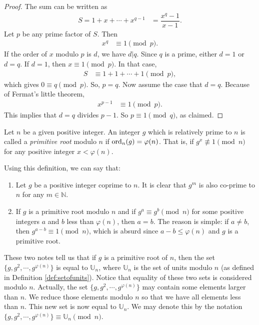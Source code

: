 \documentclass{subfile}
\begin{document}
	\begin{proof}
		The sum can be written as
			\begin{align*}
				S = 1+x+\cdots+x^{q-1} & = \dfrac{x^q-1}{x-1}.
			\end{align*}
		Let $p$ be any prime factor of $S$. Then
			\begin{align*}
				x^q & \equiv1\pmod p.
			\end{align*}
		If the order of $x$ modulo $p$ is $d$, we have $d|q$. Since $q$ is a prime, either $d=1$ or $d=q$. If $d=1$, then $x\equiv1\pmod p$. In that case,
			\begin{align*}
				S & \equiv 1+1+\cdots+1\pmod p,
			\end{align*}
		which gives $0  \equiv q\pmod p$. So, $p=q$. Now assume the case that $d=q$. Because of Fermat's little theorem,
			\begin{align*}
				x^{p-1} & \equiv1\pmod p.
			\end{align*}
		This implies that $d=q$ divides $p-1$. So $p\equiv1\pmod q$, as claimed.
	\end{proof}

	\begin{definition}
		Let $n$ be a given positive integer. An integer $g$ which is relatively prime to $n$  is called a \textit{primitive root} modulo $n$ if $\operatorname{ord}_n(g)=\varphi(n)$. That is, if $g^x\not\equiv1\pmod n$ for any positive integer $x<\varphi(n)$.
	\end{definition}

	\begin{note}
		Using this definition, we can say that:
			\begin{enumerate}
				\item Let $g$ be a positive integer coprime to $n$. It is clear that $g^m$ is also co-prime to $n$ for any $m \in \mathbb N$.
				\item If $g$ is a primitive root modulo $n$ and if $g^a \equiv g^b \pmod n$ for some positive integers $a$ and $b$ less than $\varphi(n)$, then $a=b$. The reason is simple: if $a \neq b$, then $g^{a-b} \equiv 1 \pmod n$, which is absurd since $a-b \leq \varphi(n)$ and $g$ is a primitive root.
			\end{enumerate}
	\end{note}

These two notes tell us that if $g$ is a primitive root of $n$, then the set $\{g,g^2,\cdots,g^{\varphi(n)}\}$ is equal to $\mathbb U_n$, where $\mathbb U_n$ is the set of units modulo $n$ (as defined in Definition \ref{def:setofunits}). Notice that equality of these two sets is considered modulo $n$. Actually, the set $\{g,g^2,\cdots,g^{\varphi(n)}\}$ may contain some elements larger than $n$. We reduce those elements modulo $n$ so that we have all elements less than $n$. This new set is now equal to $\mathbb U_n$. We may denote this by the notation $\{g,g^2,\cdots,g^{\varphi(n)}\} \equiv \mathbb U_n \pmod n$.
\end{document}
